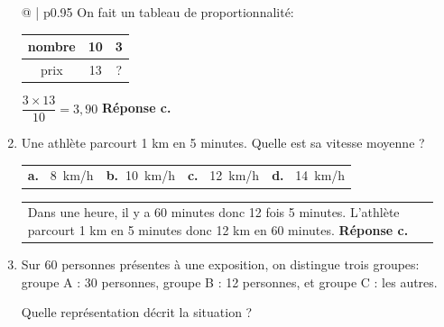 \documentclass[10pt]{article}
\begin{document}
\begin{enumerate}
\medskip

\begin{tabular}{@{\hspace{0.03\linewidth}} | p{0.95\linewidth}}
On fait un tableau de proportionnalité:
\begin{tabular}{|c|c|c|}
\hline
nombre & 10 & 3\\
\hline
prix & 13 & ?\\
\hline
\end{tabular}

$\dfrac{3\times 13}{10}=3,90$
\hfill\textbf{Réponse c.}
\end{tabular}

\bigskip

\item Une athlète parcourt 1 km en 5 minutes. Quelle est sa vitesse moyenne ?

\begin{tabularx}{\linewidth}{*{4}{X}}
\textbf{a.~} 8~km/h &\textbf{b.~}10~km/h&\textbf{c.~} 12~km/h&\textbf{d.~} 14~km/h
\end{tabularx}

\medskip

\begin{tabular}{@{\hspace{0.03\linewidth}} | p{0.95\linewidth}}
Dans une heure, il y a 60 minutes donc 12 fois 5 minutes.
L'athlète parcourt 1 km en 5 minutes donc 12 km en 60 minutes.
\hfill\textbf{Réponse c.}
\end{tabular}

\bigskip

\item Sur 60 personnes présentes à une exposition, on distingue trois groupes:\\
 groupe A : 30 personnes,  groupe B : 12 personnes, et  groupe C : les autres.

Quelle représentation décrit la situation ?


\end{enumerate}
\end{document}
